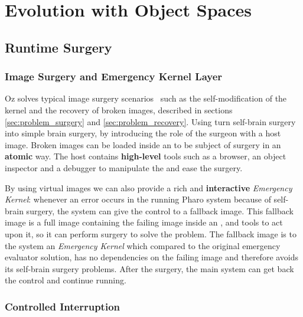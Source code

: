 
\chapter{Evolution with Object Spaces}
\minitoc
\introduction


\section{Runtime Surgery}

\subsection{Image Surgery and Emergency Kernel Layer}
 
Oz solves typical image surgery scenarios~\cite{Casa09a} such as the self-modification of the kernel and the recovery of broken images, described in sections \ref{sec:problem_surgery} and \ref{sec:problem_recovery}. Using \objectspaces turn self-brain surgery into simple brain surgery, by introducing the role of the surgeon with a host image. Broken images can be loaded inside an \objectspace to be subject of surgery in an \textbf{atomic} way. The host contains \textbf{high-level} tools such as a browser, an object inspector and a debugger to manipulate the \objectspace and ease the surgery.
 
By using virtual images we can also provide a rich and \textbf{interactive} \emph{Emergency Kernel}: whenever an error occurs in the running Pharo system because of self-brain surgery, the system can give the control to a fallback image. This fallback image is a full image containing the failing image inside an \objectspace, and tools to act upon it, so it can perform surgery to solve the problem. The fallback image is to the system an \emph{Emergency Kernel} which compared to the original emergency evaluator solution, has no dependencies on the failing image and therefore avoids its self-brain surgery problems. After the surgery, the main system can get back the control and continue running.

\subsection{Controlled Interruption}
 
